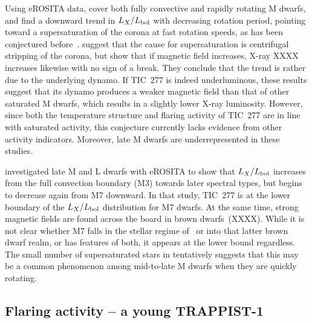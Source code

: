 \documentclass[twocolumn]{aastex631}
\begin{document}
Using eROSITA data, \citet{magaudda2022first} cover both fully convective and rapidly rotating M dwarfs, and find a downward trend in $L_X/L_{\rm bol}$ with decreasing rotation period, pointing toward a supersaturation of the corona at fast rotation speeds, as has been conjectured before~\citep{jeffries2011investigating,ramsay2020tess}.   \citet{jeffries2011investigating} suggest that the cause for supersaturation is centrifugal stripping of the corona, but \citet{reiners2022magnetism} show that if magnetic field increases, X-ray XXXX increases likewise with no sign of a break. They conclude that the trend is rather due to the underlying dynamo. If TIC~277 is indeed underluminous, these results suggest that its dynamo produces a weaker magnetic field than that of other saturated M dwarfs, which results in a slightly lower X-ray luminosity. However, since both the temperature structure and flaring activity of TIC~277 are in line with saturated activity, this conjecture currently lacks evidence from other activity indicators. Moreover, late M dwarfs are underrepresented in these studies. 

\citet{stelzer2022first} investigated late M and L dwarfs with eROSITA to show that $L_X/L_{\rm bol}$ increases from the full convection boundary (M3) towards later spectral types, but begins to decrease again from M7 downward. In that study, TIC~277 is at the lower boundary of the $L_X/L_{\rm bol}$ distribution for M7 dwarfs. At the same time, strong magnetic fields are found across the board in brown dwarfs~(XXXX). While it is not clear whether M7 falls in the stellar regime of~\citet{reiners2022magnetism} or into that latter brown dwarf realm, or has features of both, it appears at the lower bound regardless. The small number of supersaturated stars in \citet{magaudda2022first} tentatively suggests that this may be a common phenomenon among mid-to-late M dwarfs when they are quickly rotating.  



\subsection{Flaring activity -- a young TRAPPIST-1}
\label{sec:discussion:flares}
\end{document}
